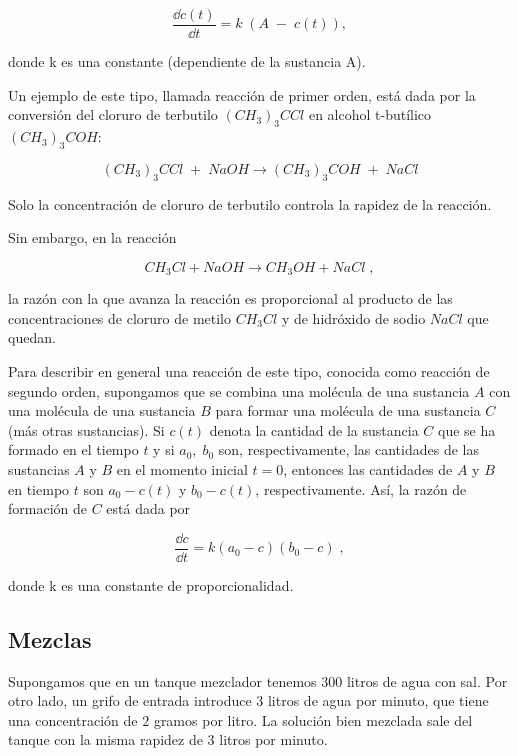  \begin{equation*}
 	\dfrac {\dd c(t)}{\dd t}= k\;( A\;- \; c(t)) ,
 \end{equation*} 
    
donde k es una constante (dependiente de la sustancia A).
  
   
Un ejemplo de este tipo, llamada reacción de primer orden, está dada por la conversión del cloruro de terbutilo $(CH_3)_3CCl$ en alcohol t-butílico $(CH_3)_3COH$: 
   
\begin{equation*}
	(CH_3)_3CCl \; + \; NaOH \longrightarrow (CH_3)_3COH\; + \; NaCl
\end{equation*}
   
   Solo la concentración de cloruro de terbutilo controla la rapidez de la reacción. 
   
   Sin embargo, en la reacción 
   
   \begin{equation*}
   	CH_3Cl + NaOH \longrightarrow  CH_3OH + NaCl \; ,
   \end{equation*}
   
la razón con la que avanza la reacción es proporcional al producto de las concentraciones de cloruro de metilo $CH_3Cl$ y de hidróxido de sodio $NaCl$ que quedan. 
   
   Para describir en general una reacción de este tipo, conocida como reacción de segundo orden, supongamos que se combina una molécula de una sustancia $A$ con una molécula de una sustancia $B$ para formar una molécula de una sustancia $C$ (más otras sustancias). Si $c(t)$ denota la cantidad de la sustancia $C$ que se ha formado en el tiempo $t$ y si $a_0,\; b_0$ son, respectivamente, las cantidades de las sustancias $A$ y $B$ en el momento inicial $t = 0$, entonces las cantidades de $A$ y $B$ en tiempo $t$ son $a_0- c(t)$ y $b_0- c(t)$, respectivamente. Así, la razón de formación de $C$ está dada por 
   
\begin{equation*}
	\frac {\dd c}{\dd t}=k(a_0-c)(b_0-c)\; ,
\end{equation*} 
   
donde k es una constante de proporcionalidad. 

\subsection{Mezclas} 
   
   Supongamos que en un tanque mezclador tenemos $300$ litros de agua con sal. Por otro lado, un grifo de entrada introduce $3$ litros de agua por minuto, que tiene una concentración de $2$ gramos por litro. La solución bien mezclada sale del tanque con la misma rapidez de $3$ litros por minuto. 
   
